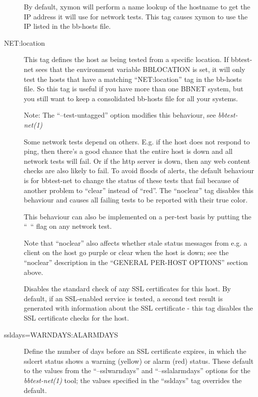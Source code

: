\begin{description}
\item[] By default, xymon will perform a name lookup of the
  hostname to get the IP address it will use for network tests. This
  tag causes xymon to use the IP listed in the bb-hosts file. 


 

\item[NET:location] This tag defines the host as being tested from a
  specific location. If bbtest-net sees that the environment variable
  BBLOCATION is set, it will only test the hosts that have a matching
  ``NET:location'' tag in the bb-hosts file. So this tag is useful if
  you have more than one BBNET system, but you still want to keep a
  consolidated bb-hosts file for all your systems. 


  Note: The ``--test-untagged'' option modifies this behaviour, see \emph{bbtest-net(1)}



 

\item[] Some network tests depend on others. E.g. if the host
  does not respond to ping, then there's a good chance that the entire
  host is down and all network tests will fail. Or if the http server
  is down, then any web content checks are also likely to fail. To
  avoid floods of alerts, the default behaviour is for bbtest-net to
  change the status of these tests that fail because of another
  problem to ``clear'' instead of ``red''. The ``noclear'' tag
  disables this behaviour and causes all failing tests to be reported
  with their true color. 


  This behaviour can also be implemented on a per-test basis by putting the ``~`` flag on any network test. 


  Note that ``noclear'' also affects whether stale status messages
  from e.g. a client on the host go purple or clear when the host is
  down; see the ``noclear'' description in the ``GENERAL PER-HOST
  OPTIONS'' section above. 

\item[] Disables the standard check of any SSL certificates
  for this host. By default, if an SSL-enabled service is tested, a
  second test result is generated with information about the SSL
  certificate - this tag disables the SSL certificate checks for the
  host. 


 

\item[ssldays=WARNDAYS:ALARMDAYS] Define the number of days before an
  SSL certificate expires, in which the sslcert status shows a warning
  (yellow) or alarm (red) status. These default to the values from the
  ``--sslwarndays'' and ``--sslalarmdays'' options for the
  \emph{bbtest-net(1)} tool; the values specified in the ``ssldays''
  tag overrides the default. 



\end{description}
